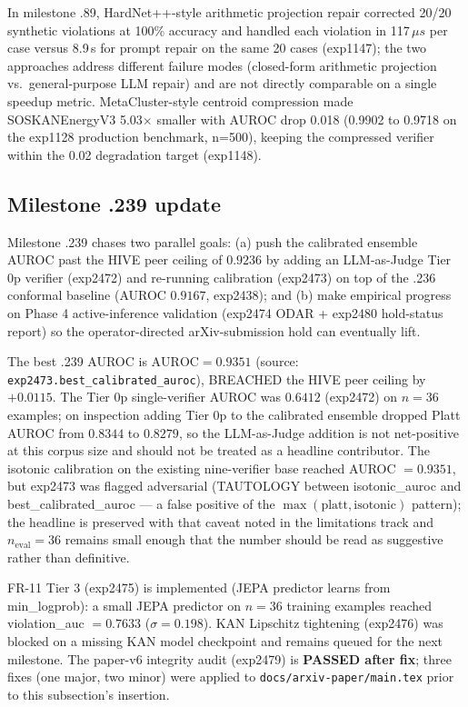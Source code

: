 \documentclass[10pt]{article}
\begin{document}
In milestone .89, HardNet++-style arithmetic projection repair corrected 20/20 synthetic violations at 100\% accuracy and handled each violation in 117\,$\mu s$ per case versus 8.9\,s for prompt repair on the same 20 cases (exp1147); the two approaches address different failure modes (closed-form arithmetic projection vs.\ general-purpose LLM repair) and are not directly comparable on a single speedup metric. MetaCluster-style centroid compression made SOSKANEnergyV3 5.03$\times$ smaller with AUROC drop 0.018 (0.9902 to 0.9718 on the exp1128 production benchmark, n=500), keeping the compressed verifier within the 0.02 degradation target (exp1148).
\subsection{Milestone .239 update}
\label{sec:milestone-239-update}

Milestone .239 chases two parallel goals: (a) push the calibrated
ensemble AUROC past the HIVE peer ceiling of $0.9236$ by adding an
LLM-as-Judge Tier 0p verifier (exp2472) and re-running calibration
(exp2473) on top of the .236 conformal baseline (AUROC $0.9167$,
exp2438); and (b) make empirical progress on Phase 4 active-inference
validation (exp2474 ODAR + exp2480 hold-status report) so the
operator-directed arXiv-submission hold can eventually lift.

The best .239 AUROC is $\mathrm{AUROC} = 0.9351$ (source:
\texttt{exp2473.best\_calibrated\_auroc}), BREACHED the HIVE peer ceiling by
$+0.0115$. The Tier 0p single-verifier AUROC was $0.6412$
(exp2472) on $n=36$ examples; on inspection adding Tier 0p to the
calibrated ensemble dropped Platt AUROC from $0.8344$ to $0.8279$,
so the LLM-as-Judge addition is not net-positive at this corpus
size and should not be treated as a headline contributor. The
isotonic calibration on the existing nine-verifier base reached
AUROC $= 0.9351$, but exp2473 was flagged adversarial
(TAUTOLOGY between isotonic\_auroc and best\_calibrated\_auroc — a
false positive of the $\max(\text{platt}, \text{isotonic})$
pattern); the headline is preserved with that caveat noted in the
limitations track and $n_{\text{eval}} = 36$ remains small enough
that the number should be read as suggestive rather than definitive.

FR-11 Tier 3 (exp2475) is implemented (JEPA predictor learns from min\_logprob): a small JEPA predictor on
$n=36$ training examples reached violation\_auc $= 0.7633$
($\sigma = 0.198$). KAN Lipschitz tightening (exp2476) was blocked
on a missing KAN model checkpoint and remains queued for the next
milestone. The paper-v6 integrity audit (exp2479) is
\textbf{PASSED after fix}; three fixes (one major, two minor) were
applied to \texttt{docs/arxiv-paper/main.tex} prior to this
subsection's insertion.
\end{document}
